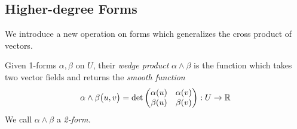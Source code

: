 	



\clearpage

\subsection{Higher-degree Forms}\label{sec:kform}

We introduce a new operation on forms which generalizes the cross product of vectors.

\begin{defn}{}{}
	Given 1-forms $\alpha,\beta$ on $U$, their \emph{wedge product} $\alpha\wedge\beta$ is the function which takes two vector fields and returns the \emph{smooth function}
	\[
		\alpha\wedge\beta\bigl(u,v\bigr)
		=\det
		\begin{pmatrix}
			\alpha(u)&\alpha(v)\\
			\beta(u)&\beta(v)
		\end{pmatrix}
		:U\to\mathbb{R}
	\]
	We call $\alpha\wedge\beta$ a \emph{2-form.}
\end{defn}

